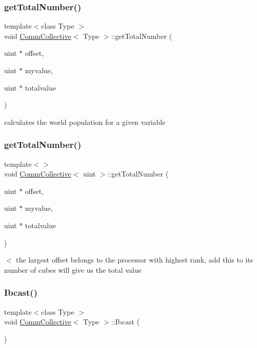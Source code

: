 \subsubsection{\texorpdfstring{get\+Total\+Number()}{getTotalNumber()}\hspace{0.1cm}{\footnotesize\ttfamily [1/2]}}
{\footnotesize\ttfamily template$<$class Type $>$ \\
void \mbox{\hyperlink{classCommCollective}{Comm\+Collective}}$<$ Type $>$\+::get\+Total\+Number (\begin{DoxyParamCaption}\item[{uint $\ast$}]{offset,  }\item[{uint $\ast$}]{myvalue,  }\item[{uint $\ast$}]{totalvalue }\end{DoxyParamCaption})}

calculates the world population for a given variable \mbox{\label{classCommCollective_a493fba4b35a6f42599753b48c431684a}} 
\subsubsection{\texorpdfstring{get\+Total\+Number()}{getTotalNumber()}\hspace{0.1cm}{\footnotesize\ttfamily [2/2]}}
{\footnotesize\ttfamily template$<$$>$ \\
void \mbox{\hyperlink{classCommCollective}{Comm\+Collective}}$<$ uint $>$\+::get\+Total\+Number (\begin{DoxyParamCaption}\item[{uint $\ast$}]{offset,  }\item[{uint $\ast$}]{myvalue,  }\item[{uint $\ast$}]{totalvalue }\end{DoxyParamCaption})}

$<$ the largest offset belongs to the processor with highest rank, add this to its number of cubes will give us the total value \mbox{\label{classCommCollective_af79e85456fe4bf007ccb6ad0c7e41151}} 
\subsubsection{\texorpdfstring{Ibcast()}{Ibcast()}}
{\footnotesize\ttfamily template$<$class Type $>$ \\
void \mbox{\hyperlink{classCommCollective}{Comm\+Collective}}$<$ Type $>$\+::Ibcast (\begin{DoxyParamCaption}{ }\end{DoxyParamCaption})}

